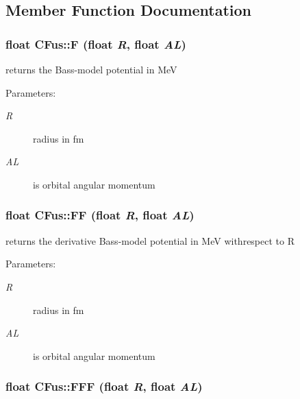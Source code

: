 \subsection{Member Function Documentation}
\subsubsection{\setlength{\rightskip}{0pt plus 5cm}float CFus::F (float {\em R}, float {\em AL})\hspace{0.3cm}{\tt  [protected]}}\label{classCFus_7797d2e1278a94106f01e05283c7974a}


returns the Bass-model potential in Me\-V \begin{Desc}
\item[Parameters:]
\begin{description}
\item[{\em R}]radius in fm \item[{\em AL}]is orbital angular momentum \end{description}
\end{Desc}
\subsubsection{\setlength{\rightskip}{0pt plus 5cm}float CFus::FF (float {\em R}, float {\em AL})\hspace{0.3cm}{\tt  [protected]}}\label{classCFus_cc36f0ff2cf89c4c729664f8d9bcdcf7}


returns the derivative Bass-model potential in Me\-V withrespect to R \begin{Desc}
\item[Parameters:]
\begin{description}
\item[{\em R}]radius in fm \item[{\em AL}]is orbital angular momentum \end{description}
\end{Desc}
\subsubsection{\setlength{\rightskip}{0pt plus 5cm}float CFus::FFF (float {\em R}, float {\em AL})\hspace{0.3cm}{\tt  [protected]}}\label{classCFus_0108da710abb1a70eff8491e5ab4c216}



